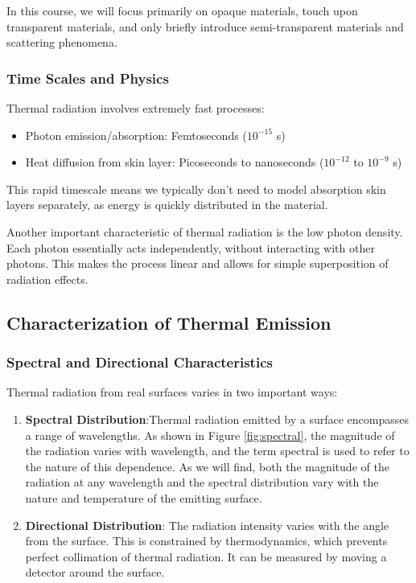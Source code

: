 In this course, we will focus primarily on opaque materials, touch upon transparent materials, and only briefly introduce semi-transparent materials and scattering phenomena.

\subsubsection*{Time Scales and Physics}

Thermal radiation involves extremely fast processes:
\begin{itemize}
    \item Photon emission/absorption: Femtoseconds ($10^{-15}$ s)
    \item Heat diffusion from skin layer: Picoseconds to nanoseconds ($10^{-12}$ to $10^{-9}$ s)
\end{itemize}

This rapid timescale means we typically don't need to model absorption skin layers separately, as energy is quickly distributed in the material.

Another important characteristic of thermal radiation is the low photon density. Each photon essentially acts independently, without interacting with other photons. This makes the process linear and allows for simple superposition of radiation effects.

\subsection*{Characterization of Thermal Emission}

\subsubsection*{Spectral and Directional Characteristics}

Thermal radiation from real surfaces varies in two important ways:

\begin{enumerate}
    \item \textbf{Spectral Distribution}:Thermal radiation emitted by a surface encompasses a range of wavelengths. As shown in Figure \ref{fig:spectral}, the magnitude of the radiation varies with wavelength, and the term spectral is used to refer to the nature of this dependence. As we will find, both the magnitude of the radiation at any wavelength and the spectral distribution vary with the nature and temperature of the emitting surface.
    
    \item \textbf{Directional Distribution}: The radiation intensity varies with the angle from the surface. This is constrained by thermodynamics, which prevents perfect collimation of thermal radiation. It can be measured by moving a detector around the surface.
\end{enumerate}

